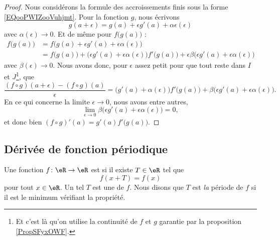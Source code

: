 \begin{proof}
	Nous considérons la formule des accroissements finis sous la forme \eqref{EQooPWIZooVuhjmt}. Pour la fonction \( g\), nous écrivons
	\begin{equation}
		g(a+\epsilon)=g(a)+\epsilon g'(a)+\alpha\epsilon(\epsilon)
	\end{equation}
	avec \( \alpha(\epsilon)\to 0\). Et de même pour \( f\big( g(a) \big)\) :
	\begin{subequations}
		\begin{align}
			f\big( g(a) \big) & =f\big( g(a)+\epsilon g'(a)+\epsilon\alpha(\epsilon) \big)                                                                                                \\
			                  & =f\big( g(a) \big)+\big( \epsilon g'(a)+\epsilon\alpha(\epsilon) \big)f'\big( g(a) \big)+\epsilon\beta\big( \epsilon g'(a)+\epsilon\alpha(\epsilon) \big)
		\end{align}
	\end{subequations}
	avec \( \beta(\epsilon)\to 0\). Nous avons donc, pour \( \epsilon\) assez petit pour que tout reste dans \( I\) et \( J\)\footnote{Et c'est là qu'on utilise la continuité de \( f\) et \( g\) garantie par la proposition \ref{PropSFyxOWF}.}, que
	\begin{equation}
		\frac{ (f\circ g)(a+\epsilon)-(f\circ g)(a) }{ \epsilon }=\big( g'(a)+\alpha(\epsilon) \big)f'\big( g(a) \big)+\beta\big( \epsilon g'(a)+\epsilon\alpha(\epsilon) \big).
	\end{equation}
	En ce qui concerne la limite \( \epsilon\to 0\), nous avons entre autres,
	\begin{equation}
		\lim_{\epsilon\to 0}\beta\big( \epsilon g'(a)+\epsilon\alpha(\epsilon) \big)=0,
	\end{equation}
	et donc bien \( (f\circ g)'(a)=g'( a )f'\big( g(a) \big)\).
\end{proof}

\subsection{Dérivée de fonction périodique}

\begin{definition}      \label{DEFooHUZAooYyBmwe}
	Une fonction \( f\colon \eR\to \eR\) est  si il existe \( T\in \eR\) tel que
	\begin{equation}
		f(x+T)=f(x)
	\end{equation}
	pour tout \( x\in \eR\). Un tel \( T\) est une  de \( f\). Nous disons que \( T\) est \emph{la} période de \( f\) si il est le minimum vérifiant la propriété.
\end{definition}

